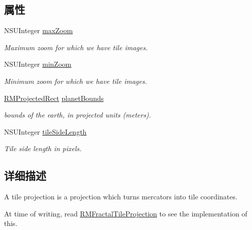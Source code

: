 \subsection*{属性}
\begin{DoxyCompactItemize}
\item 
N\-S\-U\-Integer \hyperlink{protocol_r_m_mercator_to_tile_projection-p_ae98173b5589ce9707510ee13a5bd6a23}{max\-Zoom}
\begin{DoxyCompactList}\small\item\em Maximum zoom for which we have tile images. \end{DoxyCompactList}\item 
N\-S\-U\-Integer \hyperlink{protocol_r_m_mercator_to_tile_projection-p_a3db7c10c5566330cdd76e97519f87f6e}{min\-Zoom}
\begin{DoxyCompactList}\small\item\em Minimum zoom for which we have tile images. \end{DoxyCompactList}\item 
\hyperlink{struct_r_m_projected_rect}{R\-M\-Projected\-Rect} \hyperlink{protocol_r_m_mercator_to_tile_projection-p_a5bb487ce4d5c60437bc63dd355371bfd}{planet\-Bounds}
\begin{DoxyCompactList}\small\item\em bounds of the earth, in projected units (meters). \end{DoxyCompactList}\item 
N\-S\-U\-Integer \hyperlink{protocol_r_m_mercator_to_tile_projection-p_a9e7426ca0ae5a5375822f500a49cd829}{tile\-Side\-Length}
\begin{DoxyCompactList}\small\item\em Tile side length in pixels. \end{DoxyCompactList}\end{DoxyCompactItemize}


\subsection{详细描述}
A tile projection is a projection which turns mercators into tile coordinates. 

At time of writing, read \hyperlink{interface_r_m_fractal_tile_projection}{R\-M\-Fractal\-Tile\-Projection} to see the implementation of this. 

